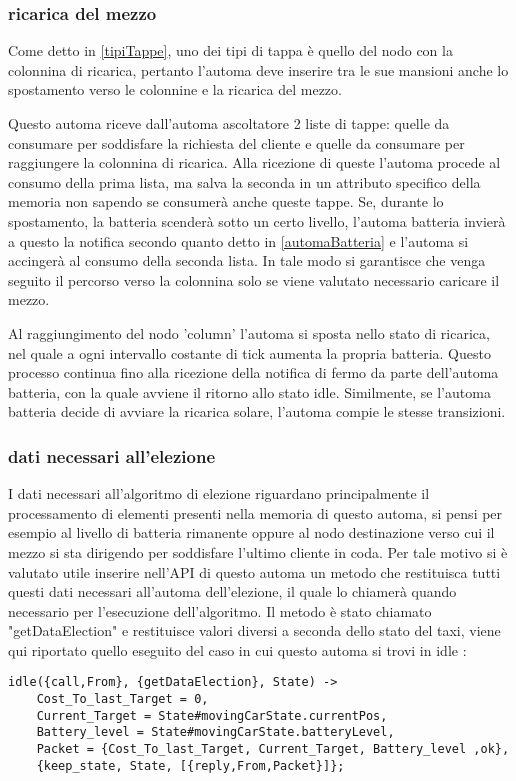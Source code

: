 \subsubsection{ricarica del mezzo} \label{tappe colonnina}
Come detto in \ref{tipiTappe}, uno dei tipi di tappa è quello del nodo con la colonnina di ricarica, pertanto l'automa deve inserire tra le sue mansioni anche lo spostamento verso le colonnine e la ricarica del mezzo.

Questo automa riceve dall'automa ascoltatore 2 liste di tappe: quelle da consumare per soddisfare la richiesta del cliente e quelle da consumare per raggiungere la colonnina di ricarica. Alla ricezione di queste l'automa procede al consumo della prima lista, ma salva la seconda in un attributo specifico della memoria non sapendo se consumerà anche queste tappe. Se, durante lo spostamento, la batteria scenderà sotto un certo livello, l'automa batteria invierà a questo la notifica secondo quanto detto in \ref{automaBatteria} e l'automa si accingerà al consumo della seconda lista. 
In tale modo si garantisce che venga seguito il percorso verso la colonnina solo se viene valutato necessario caricare il mezzo.

Al raggiungimento del nodo 'column' l'automa si sposta nello stato di ricarica, nel quale a ogni intervallo costante di tick aumenta la propria batteria. Questo processo continua fino alla ricezione della notifica di fermo da parte dell'automa batteria, con la quale avviene il ritorno allo stato idle.
Similmente, se l'automa batteria decide di avviare la ricarica solare, l'automa compie le stesse transizioni.

\subsubsection{dati necessari all'elezione}
I dati necessari all'algoritmo di elezione riguardano principalmente il processamento di elementi presenti nella memoria di questo automa, si pensi per esempio al livello di batteria rimanente oppure al nodo destinazione verso cui il mezzo si sta dirigendo per soddisfare l'ultimo cliente in coda.
Per tale motivo si è valutato utile inserire nell'API di questo automa un metodo che restituisca tutti questi dati necessari all'automa dell'elezione, il quale lo chiamerà quando necessario per l'esecuzione dell'algoritmo. Il metodo è stato chiamato "getDataElection" e restituisce valori diversi a seconda dello stato del taxi, viene qui riportato quello eseguito del caso in cui questo automa si trovi in idle :

\begin{lstlisting}
idle({call,From}, {getDataElection}, State) ->
	Cost_To_last_Target = 0,
	Current_Target = State#movingCarState.currentPos,
	Battery_level = State#movingCarState.batteryLevel,
	Packet = {Cost_To_last_Target, Current_Target, Battery_level ,ok},
	{keep_state, State, [{reply,From,Packet}]};
\end{lstlisting}





